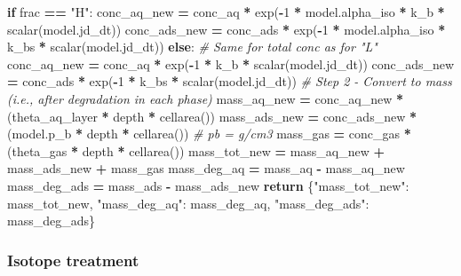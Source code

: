 \documentclass[]{article}
\newenvironment{Shaded}{\begin{snugshade}}{\end{snugshade}}
\newcommand{\DecValTok}[1]{\textcolor[rgb]{0.00,0.00,0.81}{#1}}
\newcommand{\StringTok}[1]{\textcolor[rgb]{0.31,0.60,0.02}{#1}}
\newcommand{\CommentTok}[1]{\textcolor[rgb]{0.56,0.35,0.01}{\textit{#1}}}
\newcommand{\ControlFlowTok}[1]{\textcolor[rgb]{0.13,0.29,0.53}{\textbf{#1}}}
\newcommand{\OperatorTok}[1]{\textcolor[rgb]{0.81,0.36,0.00}{\textbf{#1}}}
\newcommand{\NormalTok}[1]{#1}
\begin{document}
\begin{Shaded}
\begin{Highlighting}[]
    \ControlFlowTok{if}\NormalTok{ frac }\OperatorTok{==} \StringTok{"H"}\NormalTok{:}
\NormalTok{        conc_aq_new }\OperatorTok{=}\NormalTok{ conc_aq }\OperatorTok{*}\NormalTok{ exp(}\OperatorTok{-}\DecValTok{1} \OperatorTok{*}\NormalTok{ model.alpha_iso }\OperatorTok{*}\NormalTok{ k_b }\OperatorTok{*}\NormalTok{ scalar(model.jd_dt))}
\NormalTok{        conc_ads_new }\OperatorTok{=}\NormalTok{ conc_ads }\OperatorTok{*}\NormalTok{ exp(}\OperatorTok{-}\DecValTok{1} \OperatorTok{*}\NormalTok{ model.alpha_iso }\OperatorTok{*}\NormalTok{ k_bs }\OperatorTok{*}\NormalTok{ scalar(model.jd_dt))}
    \ControlFlowTok{else}\NormalTok{:  }\CommentTok{# Same for total conc as for "L"}
\NormalTok{        conc_aq_new }\OperatorTok{=}\NormalTok{ conc_aq }\OperatorTok{*}\NormalTok{ exp(}\OperatorTok{-}\DecValTok{1} \OperatorTok{*}\NormalTok{ k_b }\OperatorTok{*}\NormalTok{ scalar(model.jd_dt))}
\NormalTok{        conc_ads_new }\OperatorTok{=}\NormalTok{ conc_ads }\OperatorTok{*}\NormalTok{ exp(}\OperatorTok{-}\DecValTok{1} \OperatorTok{*}\NormalTok{ k_bs }\OperatorTok{*}\NormalTok{ scalar(model.jd_dt))}
    \CommentTok{# Step 2 - Convert to mass (i.e., after degradation in each phase)}
\NormalTok{    mass_aq_new }\OperatorTok{=}\NormalTok{ conc_aq_new }\OperatorTok{*}\NormalTok{ (theta_aq_layer }\OperatorTok{*}\NormalTok{ depth }\OperatorTok{*}\NormalTok{ cellarea())}
\NormalTok{    mass_ads_new }\OperatorTok{=}\NormalTok{ conc_ads_new }\OperatorTok{*}\NormalTok{ (model.p_b }\OperatorTok{*}\NormalTok{ depth }\OperatorTok{*}\NormalTok{ cellarea())  }\CommentTok{# pb = g/cm3}
\NormalTok{    mass_gas }\OperatorTok{=}\NormalTok{ conc_gas }\OperatorTok{*}\NormalTok{ (theta_gas }\OperatorTok{*}\NormalTok{ depth }\OperatorTok{*}\NormalTok{ cellarea())}
\NormalTok{    mass_tot_new }\OperatorTok{=}\NormalTok{ mass_aq_new }\OperatorTok{+}\NormalTok{ mass_ads_new }\OperatorTok{+}\NormalTok{ mass_gas}
\NormalTok{    mass_deg_aq }\OperatorTok{=}\NormalTok{ mass_aq }\OperatorTok{-}\NormalTok{ mass_aq_new}
\NormalTok{    mass_deg_ads }\OperatorTok{=}\NormalTok{ mass_ads }\OperatorTok{-}\NormalTok{ mass_ads_new}
    \ControlFlowTok{return}\NormalTok{ \{}\StringTok{"mass_tot_new"}\NormalTok{: mass_tot_new,}
            \StringTok{"mass_deg_aq"}\NormalTok{: mass_deg_aq,}
            \StringTok{"mass_deg_ads"}\NormalTok{: mass_deg_ads\}}
\end{Highlighting}
\end{Shaded}

\hypertarget{isotope-treatment}{%
\subsubsection{Isotope treatment}\label{isotope-treatment}}
\end{document}
